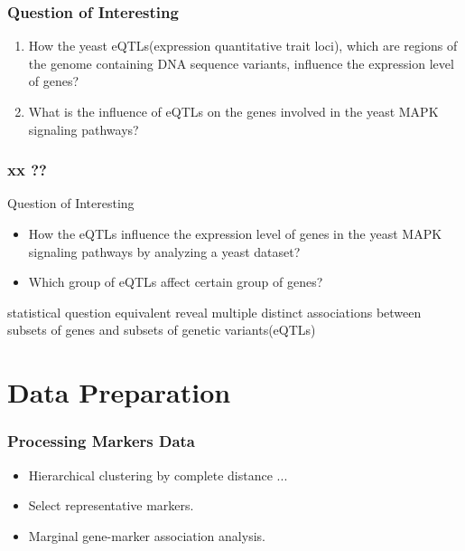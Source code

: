 \begin{frame}\frametitle{Question of Interesting}
    \begin{enumerate}
        \item How the yeast eQTLs(expression quantitative trait loci), which are regions of the genome containing DNA sequence variants, influence the expression level of genes? 
        \item What is the influence of eQTLs on the genes involved in the yeast MAPK signaling pathways?
    \end{enumerate}
\end{frame}

\begin{frame}\frametitle{ xx ??}
    \begin{block}{Question of Interesting}
        \begin{itemize}
        \item How the eQTLs influence the expression level of genes in the yeast MAPK signaling pathways by analyzing a yeast dataset?
        \item Which group of eQTLs affect certain group of genes?
        \end{itemize}
    \end{block}
    
    \begin{block}{statistical question equivalent}
        reveal multiple distinct associations between subsets of genes and subsets of genetic variants(eQTLs)
    \end{block}
\end{frame}


\section{Data Preparation}
\begin{frame}
    \sectionpage
\end{frame}

\begin{frame}
    \frametitle{Processing Markers Data}

    \begin{itemize}
        \item Hierarchical clustering by complete distance ...
        \item Select representative markers.
        \item Marginal gene-marker association analysis.
    \end{itemize}
\end{frame}

